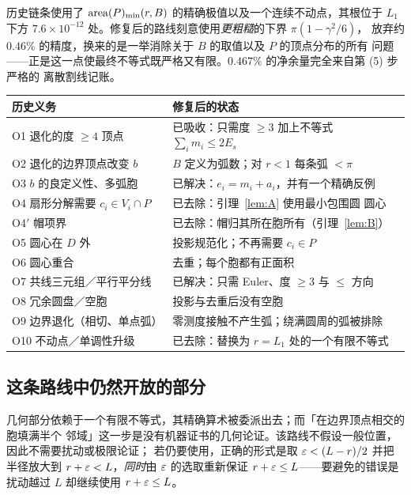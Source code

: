 \begin{remark}[修复的内容]
历史链条使用了 $\operatorname{area}(P)_{\min}(r,B)$ 的精确极值以及一个连续不动点，其根位于 $L_1$ 下方
$7.6\times10^{-12}$ 处。修复后的路线刻意使用\emph{更粗糙}的下界 $\pi(1-\gamma^2/6)$，
放弃约 $0.46\%$ 的精度，换来的是一举消除关于 $B$ 的取值以及 $P$ 的顶点分布的所有
问题——正是这一点使最终不等式既严格又有限。$0.467\%$ 的净余量完全来自第 (5) 步严格的
离散割线记账。
\end{remark}

\begin{center}
\footnotesize
\begin{tabular}{@{}>{\raggedright\arraybackslash}p{}>{\raggedright\arraybackslash}p{}@{}}
\toprule
历史义务 & 修复后的状态 \\
\midrule
O1 退化的度 $\ge4$ 顶点 & 已吸收：只需度 $\ge3$ 加上不等式
$\sum_im_i\le2E_s$ \\
O2 退化的边界顶点改变 $b$ & $B$ 定义为弧数；对 $r<1$ 每条弧
$<\!\pi$ \\
O3 $b$ 的良定义性、多弧胞 & 已解决：$e_i=m_i+a_i$，并有一个精确反例 \\
O4 扇形分解需要 $c_i\in V_i\cap P$ & 已去除：引理~\ref{lem:A} 使用最小包围圆
圆心 \\
O4$'$ 帽项界 & 已去除：帽归其所在胞所有（引理~\ref{lem:B}） \\
O5 圆心在 $D$ 外 & 投影规范化；不再需要 $c_i\in P$ \\
O6 圆心重合 & 去重；每个胞都有正面积 \\
O7 共线三元组／平行平分线 & 已解决：只需 Euler、度 $\ge3$ 与 $\le$ 方向 \\
O8 冗余圆盘／空胞 & 投影与去重后没有空胞 \\
O9 边界退化（相切、单点弧） & 零测度接触不产生弧；绕满圆周的弧被排除 \\
O10 不动点／单调性升级 & 已去除：替换为 $r=L_1$ 处的一个有限不等式 \\
\bottomrule
\end{tabular}
\end{center}

\subsection{这条路线中仍然开放的部分}

几何部分依赖于一个有限不等式，其精确算术被委派出去；而「在边界顶点相交的胞填满半个
邻域」这一步是没有机器证书的几何论证。该路线不假设一般位置，因此不需要扰动或极限论证；
若仍要使用，正确的形式是取 $\varepsilon<(L-r)/2$ 并把半径放大到 $r+\varepsilon<L$，\emph{同时}由
$\varepsilon$ 的选取重新保证 $r+\varepsilon\le L$——要避免的错误是扰动越过 $L$ 却继续使用
$r+\varepsilon\le L$。

